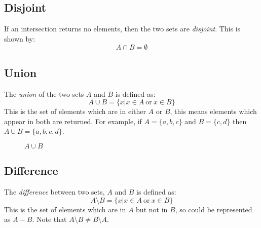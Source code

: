 \subsection{Disjoint}
If an intersection returns no elements, then the two sets are \textit{disjoint}. This is shown by:
\[A \cap B = \emptyset\]

\subsection{Union}
The \textit{union} of the two sets $A$ and $B$ is defined as:
\[A \cup B = \{ x | x \in A \mathrm{\ or \ } x \in B \}\]
This is the set of elements which are in either $A$ or $B$, this means elements which appear in both are returned. For example, if $A = \{a, b, c\}$ and $B=\{c, d\}$ then $A \cup B = \{a, b, c, d\}$.

\begin{figure}[H]
    \centering

    \caption{$A \cup B$}  
\end{figure}

\subsection{Difference}
The \textit{difference} between two sets, $A$ and $B$ is defined as:
\[A \setminus B = \{ x | x \in A \mathrm{\ or \ } x \in B\}\]
This is the set of elements which are in $A$ but not in $B$, so could be represented as $A-B$. Note that $A \setminus B \neq B \setminus A$.

